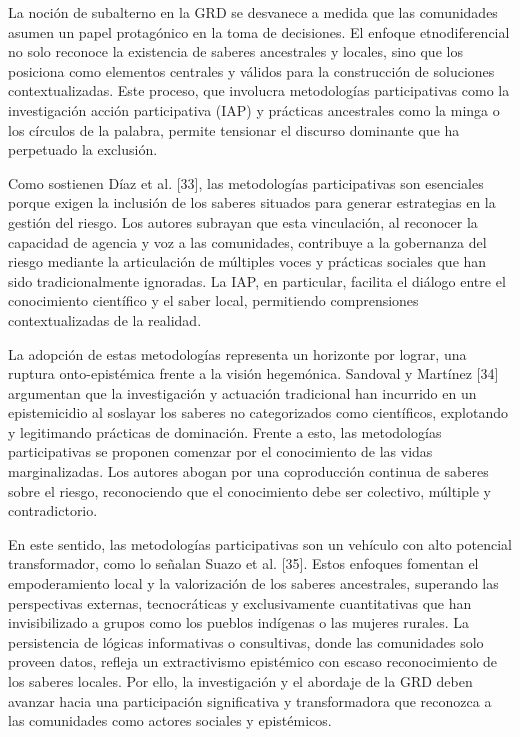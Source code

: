 \documentclass[
  spanish,
  letterpaper,
]{book}
\begin{document}
La noción de subalterno en la GRD se desvanece a medida que las
comunidades asumen un papel protagónico en la toma de decisiones. El
enfoque etnodiferencial no solo reconoce la existencia de saberes
ancestrales y locales, sino que los posiciona como elementos centrales y
válidos para la construcción de soluciones contextualizadas. Este
proceso, que involucra metodologías participativas como la investigación
acción participativa (IAP) y prácticas ancestrales como la minga o los
círculos de la palabra, permite tensionar el discurso dominante que ha
perpetuado la exclusión.

Como sostienen Díaz et al. {[}33{]}, las metodologías participativas son
esenciales porque exigen la inclusión de los saberes situados para
generar estrategias en la gestión del riesgo. Los autores subrayan que
esta vinculación, al reconocer la capacidad de agencia y voz a las
comunidades, contribuye a la gobernanza del riesgo mediante la
articulación de múltiples voces y prácticas sociales que han sido
tradicionalmente ignoradas. La IAP, en particular, facilita el diálogo
entre el conocimiento científico y el saber local, permitiendo
comprensiones contextualizadas de la realidad.

La adopción de estas metodologías representa un horizonte por lograr,
una ruptura onto-epistémica frente a la visión hegemónica. Sandoval y
Martínez {[}34{]} argumentan que la investigación y actuación
tradicional han incurrido en un epistemicidio al soslayar los saberes no
categorizados como científicos, explotando y legitimando prácticas de
dominación. Frente a esto, las metodologías participativas se proponen
comenzar por el conocimiento de las vidas marginalizadas. Los autores
abogan por una coproducción continua de saberes sobre el riesgo,
reconociendo que el conocimiento debe ser colectivo, múltiple y
contradictorio.

En este sentido, las metodologías participativas son un vehículo con
alto potencial transformador, como lo señalan Suazo et al. {[}35{]}.
Estos enfoques fomentan el empoderamiento local y la valorización de los
saberes ancestrales, superando las perspectivas externas, tecnocráticas
y exclusivamente cuantitativas que han invisibilizado a grupos como los
pueblos indígenas o las mujeres rurales. La persistencia de lógicas
informativas o consultivas, donde las comunidades solo proveen datos,
refleja un extractivismo epistémico con escaso reconocimiento de los
saberes locales. Por ello, la investigación y el abordaje de la GRD
deben avanzar hacia una participación significativa y transformadora que
reconozca a las comunidades como actores sociales y epistémicos.
\end{document}
